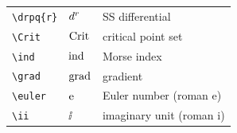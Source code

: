 \begin{longtable}{@{} p{4cm} p{5cm} p{5cm} @{}}
	\texttt{\textbackslash drpq\{r\}}   & $d^{r}$        & SS differential \\
	\texttt{\textbackslash Crit}        & $\mathrm{Crit}$           & critical point set \\
	\texttt{\textbackslash ind}         & $\mathrm{ind}$            & Morse index \\
	\texttt{\textbackslash grad}        & $\mathrm{grad}$           & gradient \\
	\texttt{\textbackslash euler}       & $\mathrm{e}$          & Euler number (roman e) \\
	\texttt{\textbackslash ii}          & $\ii$             & imaginary unit (roman i) \\
	\bottomrule
\end{longtable}